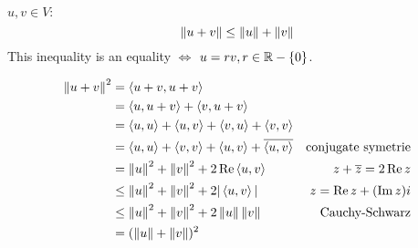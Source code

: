 \setcounter{thm}{13}
\begin{thm}
  $u,v \in V:$
  \begin{equation}
    \norm{u+v} \leq \norm{u} + \norm{v}
  \end{equation}
  This inequality is an equality $\iff$ $u=rv, r\in \real - \{0\}$.
\end{thm}
\begin{prf}
  \begin{equation}
    \begin{aligned}
      \norm{u+v}^2 
      &=    \ip{u+v}{u+v} & \\
      &=    \ip{u}{u+v}+\ip{v}{u+v} & \\
      &=    \ip{u}{u}+\ip{u}{v}+\ip{v}{u}+\ip{v}{v} & \\
      &=    \ip{u}{u}+\ip{v}{v}+\ip{u}{v}+\overline{\ip{u}{v}} & \text{conjugate symetrie}\\
      &=    \norm{u}^2+\norm{v}^2+2\operatorname{Re} \ip{u}{v} & \text{$z+\overline{z} = 2\operatorname{Re} z$}\\
      &\leq \norm{u}^2+\norm{v}^2+2|\ip{u}{v}| & \text{$z=\realpart z + (\impart z) i$} \\
      &\leq \norm{u}^2+\norm{v}^2+2\norm{u}\norm{v} & \text{Cauchy-Schwarz} \\
      &=    (\norm{u} + \norm{v})^2 &
    \end{aligned}
  \end{equation}
  \vspace{-1em}
\end{prf}
